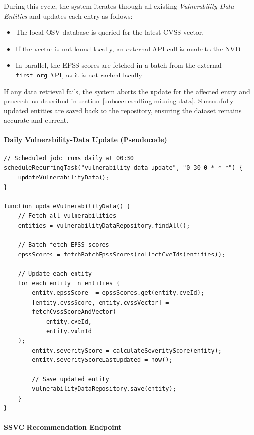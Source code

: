 During this cycle, the system iterates through all existing \textit{Vulnerability Data Entities} and updates each entry as follows:
\begin{itemize}
    \item The local \ac{OSV} database is queried for the latest \ac{CVSS} vector.
    \item If the vector is not found locally, an external \ac{API} call is made to the \ac{NVD}.
    \item In parallel, the \ac{EPSS} scores are fetched in a batch from the external \texttt{first.org} \ac{API}, as it is not cached locally.
\end{itemize}

If any data retrieval fails, the system aborts the update for the affected entry and proceeds as described in section~\ref{subsec:handling-missing-data}. Successfully updated entities are saved back to the repository, ensuring the dataset remains accurate and current.

\noindent
\paragraph{Daily Vulnerability-Data Update (Pseudocode)}
\label{par:daily-vulnerability-update-short}

\begin{verbatim}
// Scheduled job: runs daily at 00:30
scheduleRecurringTask("vulnerability-data-update", "0 30 0 * * *") {
    updateVulnerabilityData();
}

function updateVulnerabilityData() {
    // Fetch all vulnerabilities
    entities = vulnerabilityDataRepository.findAll();

    // Batch-fetch EPSS scores
    epssScores = fetchBatchEpssScores(collectCveIds(entities));

    // Update each entity
    for each entity in entities {
        entity.epssScore  = epssScores.get(entity.cveId);
        [entity.cvssScore, entity.cvssVector] =
        fetchCvssScoreAndVector(
            entity.cveId,
            entity.vulnId
    );
        entity.severityScore = calculateSeverityScore(entity);
        entity.severityScoreLastUpdated = now();

        // Save updated entity
        vulnerabilityDataRepository.save(entity);
    }
}
\end{verbatim}

\paragraph{SSVC Recommendation Endpoint}
\label{par:ssvc-recommendation-endpoint}

